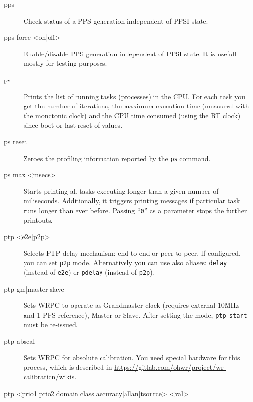 \documentclass[a4paper, 12pt]{article}
\renewcommand{\_}{\underscore\allowbreak}
\newcommand{\code}[1]{\texttt{#1}}
\begin{document}
\begin{description}
\item[pps] \mbox{}

  Check status of a PPS generation independent of PPSI state.

\item[pps force <on|off>] \mbox{}

  Enable/disable PPS generation independent of PPSI state. It is
  usefull mostly for testing purposes.

\item[ps] \mbox{}

  Prints the list of running tasks (processes) in the CPU. For each
  task you get the number of iterations, the maximum execution time
  (measured with the monotonic clock) and the CPU time consumed (using
  the RT clock) since boot or last reset of values.

\item[ps reset] \mbox{}

  Zeroes the profiling information reported by the \code{ps} command.

\item[ps max <msecs>] \mbox{}

  Starts printing all tasks executing longer than a given number of
  miliseconds. Additionally, it triggers printing messages if
  particular task runs longer than ever before. Passing ``\code{0}''
  as a parameter stops the further printouts.

\item[ptp <e2e|p2p>] \mbox{}

  Selects PTP delay mechanism: end-to-end or peer-to-peer.  If
  configured, you can set \texttt{p2p} mode. Alternatively you can use
  also aliases: \texttt{delay} (instead of \texttt{e2e}) or
  \texttt{pdelay} (instead of \texttt{p2p}).

\item[ptp gm|master|slave] \mbox{}

  Sets WRPC to operate as Grandmaster clock (requires external 10MHz
  and 1-PPS reference), Master or Slave. After setting the mode,
  \texttt{ptp start} must be re-issued.

\item[ptp abscal] \mbox{}

  Sets WRPC for absolute calibration.  You need special hardware for
  this process, which is described in
  \url{https://gitlab.com/ohwr/project/wr-calibration/wikis}.

\item[ptp <prio1|prio2|domain|class|accuracy|allan|tsource> <val>] \mbox{}


\end{description}
\end{document}
